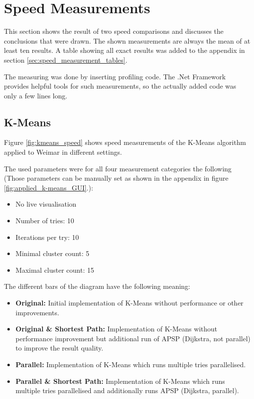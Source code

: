 \section{Speed Measurements} \label{sec:measurements-speed}
This section shows the result of two speed comparisons and discusses the conclusions that were drawn. The shown measurements are always the mean of at least ten results. A table showing all exact results was added to the appendix in section \ref{sec:speed_measurement_tables}.

The measuring was done by inserting profiling code. The .Net Framework provides helpful tools for such measurements, so the actually added code was only a few lines long.


\subsection{K-Means}
Figure \ref{fig:kmeans_speed} shows speed measurements of the K-Means algorithm applied to Weimar in different settings.

The used parameters were for all four measurement categories the following (Those parameters can be manually set as shown in the appendix in figure \ref{fig:applied_k-means_GUI}.):

\begin{itemize}
    \item No live visualisation
    \item Number of tries: 10
    \item Iterations per try: 10
    \item Minimal cluster count: 5
    \item Maximal cluster count: 15
\end{itemize}

The different bars of the diagram have the following meaning:

\begin{itemize}
    \item \textbf{Original:} Initial implementation of K-Means without performance or other improvements.
    \item \textbf{Original \& Shortest Path:} Implementation of K-Means without performance improvement but additional run of \acrshort{APSP} (Dijkstra, not parallel) to improve the result quality.
    \item \textbf{Parallel:} Implementation of K-Means which runs multiple tries parallelised.
    \item \textbf{Parallel \& Shortest Path:} Implementation of K-Means which runs multiple tries parallelised and additionally runs \acrshort{APSP} (Dijkstra, parallel).
\end{itemize}

